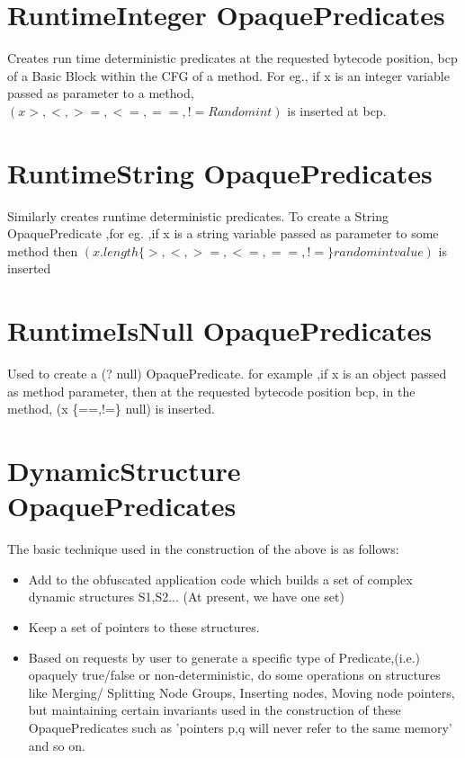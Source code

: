 \section{RuntimeInteger OpaquePredicates}
	Creates run time deterministic predicates at the requested bytecode 
position, bcp of a Basic Block within the CFG of a method. For eg., if x is an 
integer variable passed as parameter to a method, $(x {>,<,>=,<=,==,!=} Randomint)$ 
is inserted at bcp.

\section{RuntimeString OpaquePredicates}
	 Similarly creates runtime deterministic predicates. To create a String 
OpaquePredicate ,for eg. ,if x is a string variable passed as parameter to some 
method then $(x.length \{ >,<,>=,<=,==,!=\} random int value)$ is inserted

\section{RuntimeIsNull OpaquePredicates}
	Used to create a (? null) OpaquePredicate. for example ,if x is an object 
passed as method parameter, then at the requested bytecode position bcp, in the 
method, (x \{==,!=\} null) is inserted.

\section{DynamicStructure OpaquePredicates}
	The basic technique used in the construction of the above is as follows:
\begin{itemize}
\item Add to the obfuscated application code which builds a set of complex dynamic 
structures S1,S2... (At present, we have one set)

\item Keep a set of pointers to these structures.

\item Based on requests by user to generate a specific type of Predicate,(i.e.) opaquely 
true/false or non-deterministic, do some operations on structures like Merging/ 
Splitting Node Groups, Inserting nodes, Moving node pointers, but maintaining certain 
invariants used in the construction of these OpaquePredicates such as 'pointers p,q 
will never refer to the same memory'  and so on.
\end{itemize}

